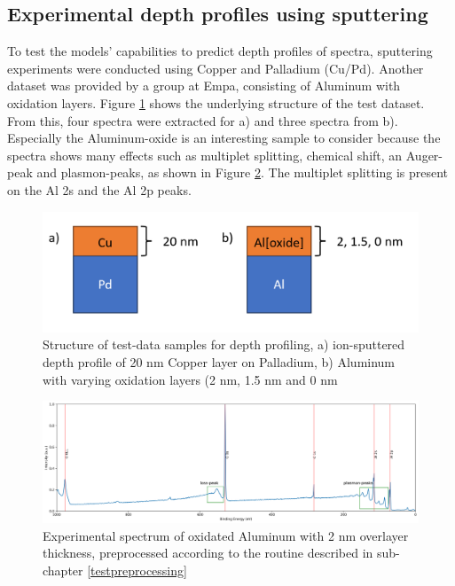 \subsection{Experimental depth profiles using sputtering}
\label{exp_depth}
To test the models' capabilities to predict depth profiles of spectra, sputtering experiments were conducted using Copper and Palladium (Cu/Pd). Another dataset was provided by a group at Empa, consisting of Aluminum with oxidation layers. Figure \ref{fig:exp_samples} shows the underlying structure of the test dataset. From this, four spectra were extracted for a) and three spectra from b). Especially the Aluminum-oxide is an interesting sample to consider because the spectra shows many effects such as multiplet splitting, chemical shift, an Auger-peak and plasmon-peaks, as shown in Figure \ref{fig:exp_alox}. The multiplet splitting is present on the Al 2s and the Al 2p peaks.

\begin{figure}
    \centering
    \includegraphics[width=\textwidth]{Figures/experimental_samples.png}
    \caption{Structure of test-data samples for depth profiling, a) ion-sputtered depth profile of 20 nm Copper layer on Palladium, b) Aluminum with varying oxidation layers (2 nm, 1.5 nm and 0 nm}
    \label{fig:exp_samples}
\end{figure}

\begin{figure}
    \centering
    \includegraphics[width=\textwidth]{Figures/al_ox_2_nmspectrum.png}
    \caption{Experimental spectrum of oxidated Aluminum with 2 nm overlayer thickness, preprocessed according to the routine described in sub-chapter \ref{testpreprocessing}}
    \label{fig:exp_alox}
\end{figure}

